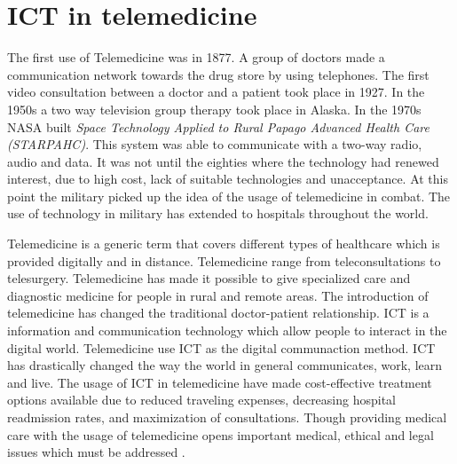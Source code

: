\section{ICT in telemedicine}

The first use of Telemedicine was in 1877. A group of doctors made a communication network towards the drug store by using telephones. The first video consultation between a doctor and a patient took place in 1927. In the 1950s a two way television group therapy took place in Alaska. In the 1970s NASA built \textit{Space Technology Applied to Rural Papago Advanced Health Care (STARPAHC)}. This system was able to communicate with a two-way radio, audio and data. It was not until the eighties where the technology had renewed interest, due to high cost, lack of suitable technologies and unacceptance. At this point the military picked up the idea of the usage of telemedicine in combat. The use of technology in military has extended to hospitals throughout the world. 


Telemedicine is a generic term that covers different types of healthcare which is provided digitally and in distance. Telemedicine range from teleconsultations to telesurgery. Telemedicine has made it possible to give specialized care and diagnostic medicine for people in rural and remote areas. The introduction of telemedicine has changed the traditional doctor-patient relationship. 
ICT is a information and communication technology which allow people to interact in the digital world. Telemedicine use ICT as the digital communaction method. ICT has drastically changed the way the world in general communicates, work, learn and live.   
The usage of ICT in telemedicine have made cost-effective treatment options available due to reduced traveling expenses, decreasing hospital readmission rates, and maximization of consultations. Though providing medical care with the usage of telemedicine opens important medical, ethical and legal issues which must be addressed \cite{considerations}.


